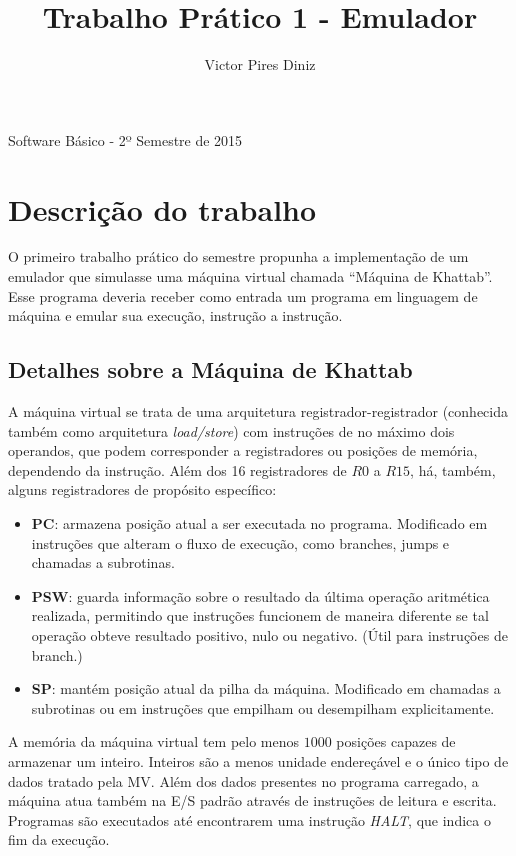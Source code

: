 \documentclass[10pt,a4paper]{article}
\title{Trabalho Prático 1 - Emulador}
\author{Victor Pires Diniz}
\numberwithin{equation}{section}
\begin{document}
\maketitle
\begin{center}
Software Básico - 2º Semestre de 2015
\end{center}

\section{Descrição do trabalho}

O primeiro trabalho prático do semestre propunha a implementação de um emulador que simulasse uma máquina virtual chamada ``Máquina de Khattab''. Esse programa deveria receber como entrada um programa em linguagem de máquina e emular sua execução, instrução a instrução.

\subsection{Detalhes sobre a Máquina de Khattab}

A máquina virtual se trata de uma arquitetura registrador-registrador (conhecida também como arquitetura \emph{load/store}) com instruções de no máximo dois operandos, que podem corresponder a registradores ou posições de memória, dependendo da instrução. Além dos 16 registradores de $R0$ a $R15$, há, também, alguns registradores de propósito específico:

\begin{itemize}
    \item \textbf{PC}: armazena posição atual a ser executada no programa. Modificado em instruções que alteram o fluxo de execução, como branches, jumps e chamadas a subrotinas.
    \item \textbf{PSW}: guarda informação sobre o resultado da última operação aritmética realizada, permitindo que instruções funcionem de maneira diferente se tal operação obteve resultado positivo, nulo ou negativo. (Útil para instruções de branch.)
    \item \textbf{SP}: mantém posição atual da pilha da máquina. Modificado em chamadas a subrotinas ou em instruções que empilham ou desempilham explicitamente.
\end{itemize}

A memória da máquina virtual tem pelo menos $1000$ posições capazes de armazenar um inteiro. Inteiros são a menos unidade endereçável e o único tipo de dados tratado pela MV. Além dos dados presentes no programa carregado, a máquina atua também na E/S padrão através de instruções de leitura e escrita. Programas são executados até encontrarem uma instrução \emph{HALT}, que indica o fim da execução.
\end{document}

